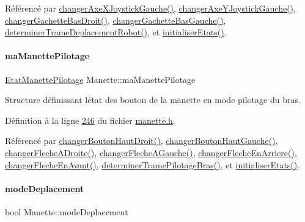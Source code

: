 Référencé par \hyperlink{manette_8cpp_source_l00421}{changer\+Axe\+X\+Joystick\+Gauche()}, \hyperlink{manette_8cpp_source_l00438}{changer\+Axe\+Y\+Joystick\+Gauche()}, \hyperlink{manette_8cpp_source_l00504}{changer\+Gachette\+Bas\+Droit()}, \hyperlink{manette_8cpp_source_l00493}{changer\+Gachette\+Bas\+Gauche()}, \hyperlink{manette_8cpp_source_l00341}{determiner\+Trame\+Deplacement\+Robot()}, et \hyperlink{manette_8cpp_source_l00023}{initialiser\+Etats()}.

\mbox{\label{class_manette_aeb3e02eaeaec4c656f78ed8fc6dae342}} 
\paragraph{\texorpdfstring{ma\+Manette\+Pilotage}{maManettePilotage}}
{\footnotesize\ttfamily \hyperlink{struct_etat_manette_pilotage}{Etat\+Manette\+Pilotage} Manette\+::ma\+Manette\+Pilotage\hspace{0.3cm}{\ttfamily [private]}}



Structure définissant l\textquotesingle{}état des bouton de la manette en mode pilotage du bras. 



Définition à la ligne \hyperlink{manette_8h_source_l00246}{246} du fichier \hyperlink{manette_8h_source}{manette.\+h}.



Référencé par \hyperlink{manette_8cpp_source_l00486}{changer\+Bouton\+Haut\+Droit()}, \hyperlink{manette_8cpp_source_l00479}{changer\+Bouton\+Haut\+Gauche()}, \hyperlink{manette_8cpp_source_l00542}{changer\+Fleche\+A\+Droite()}, \hyperlink{manette_8cpp_source_l00533}{changer\+Fleche\+A\+Gauche()}, \hyperlink{manette_8cpp_source_l00524}{changer\+Fleche\+En\+Arriere()}, \hyperlink{manette_8cpp_source_l00515}{changer\+Fleche\+En\+Avant()}, \hyperlink{manette_8cpp_source_l00375}{determiner\+Trame\+Pilotage\+Bras()}, et \hyperlink{manette_8cpp_source_l00023}{initialiser\+Etats()}.

\mbox{\label{class_manette_a4dc6231c8cc65fac03f59d323fa9a038}} 
\paragraph{\texorpdfstring{mode\+Deplacement}{modeDeplacement}}
{\footnotesize\ttfamily bool Manette\+::mode\+Deplacement\hspace{0.3cm}{\ttfamily [private]}}



